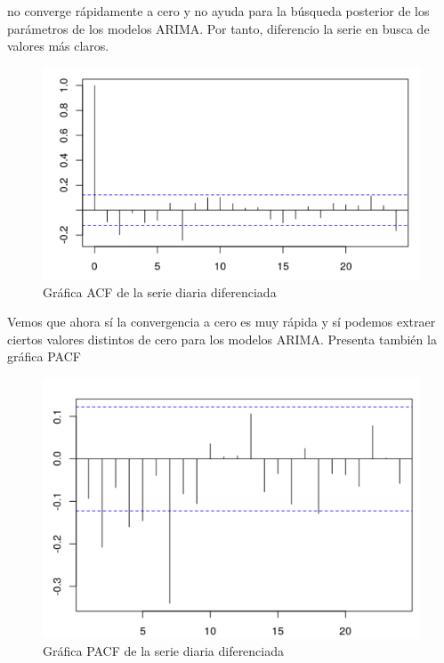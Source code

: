 no converge rápidamente a cero y no ayuda para la búsqueda posterior de los parámetros de los modelos ARIMA. Por tanto, diferencio la serie en busca de valores más claros.
\begin{figure}[H] %
	\centering
	\includegraphics[scale=0.25]{acf-diario-d.png}  %
	\caption{Gráfica ACF de la serie diaria diferenciada} 
	\label{fig:acf-diario-d}
\end{figure}

Vemos que ahora sí la convergencia a cero es muy rápida y sí podemos extraer ciertos valores distintos de cero para los modelos ARIMA. Presenta también la gráfica PACF

\begin{figure}[H] %
	\centering
	\includegraphics[scale=0.25]{pacf-diario-d.png}  %
	\caption{Gráfica PACF de la serie diaria diferenciada} 
	\label{fig:pacf-diario-d}
\end{figure}

